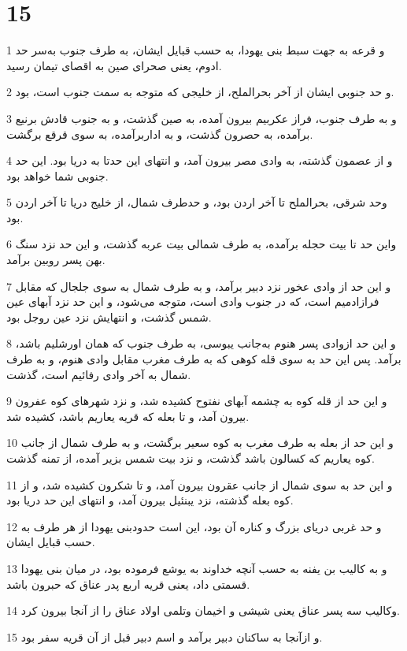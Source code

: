 \chapter{15}

\par 1 و قرعه به جهت سبط بنی یهودا، به حسب قبایل ایشان، به طرف جنوب به‌سر حد ادوم، یعنی صحرای صین به اقصای تیمان رسید.
\par 2 و حد جنوبی ایشان از آخر بحرالملح، از خلیجی که متوجه به سمت جنوب است، بود.
\par 3 و به طرف جنوب، فراز عکربیم بیرون آمده، به صین گذشت، و به جنوب قادش برنیع برآمده، به حصرون گذشت، و به اداربرآمده، به سوی قرقع برگشت.
\par 4 و از عصمون گذشته، به وادی مصر بیرون آمد، و انتهای این حدتا به دریا بود. این حد جنوبی شما خواهد بود.
\par 5 وحد شرقی، بحرالملح تا آخر اردن بود، و حدطرف شمال، از خلیج دریا تا آخر اردن بود.
\par 6 واین حد تا بیت حجله برآمده، به طرف شمالی بیت عربه گذشت، و این حد نزد سنگ بهن پسر روبین برآمد.
\par 7 و این حد از وادی عخور نزد دبیر برآمد، و به طرف شمال به سوی جلجال که مقابل فرازادمیم است، که در جنوب وادی است، متوجه می‌شود، و این حد نزد آبهای عین شمس گذشت، و انتهایش نزد عین روجل بود.
\par 8 و این حد ازوادی پسر هنوم به‌جانب یبوسی، به طرف جنوب که همان اورشلیم باشد، برآمد. پس این حد به سوی قله کوهی که به طرف مغرب مقابل وادی هنوم، و به طرف شمال به آخر وادی رفائیم است، گذشت.
\par 9 و این حد از قله کوه به چشمه آبهای نفتوح کشیده شد، و نزد شهرهای کوه عفرون بیرون آمد، و تا بعله که قریه یعاریم باشد، کشیده شد.
\par 10 و این حد از بعله به طرف مغرب به کوه سعیر برگشت، و به طرف شمال از جانب کوه یعاریم که کسالون باشد گذشت، و نزد بیت شمس بزیر آمده، از تمنه گذشت.
\par 11 و این حد به سوی شمال از جانب عقرون بیرون آمد، و تا شکرون کشیده شد، و از کوه بعله گذشته، نزد یبنئیل بیرون آمد، و انتهای این حد دریا بود.
\par 12 و حد غربی دریای بزرگ و کناره آن بود، این است حدودبنی یهودا از هر طرف به حسب قبایل ایشان.
\par 13 و به کالیب بن یفنه به حسب آنچه خداوند به یوشع فرموده بود، در میان بنی یهودا قسمتی داد، یعنی قریه اربع پدر عناق که حبرون باشد.
\par 14 وکالیب سه پسر عناق یعنی شیشی و اخیمان وتلمی اولاد عناق را از آنجا بیرون کرد.
\par 15 و ازآنجا به ساکنان دبیر برآمد و اسم دبیر قبل از آن قریه سفر بود.
